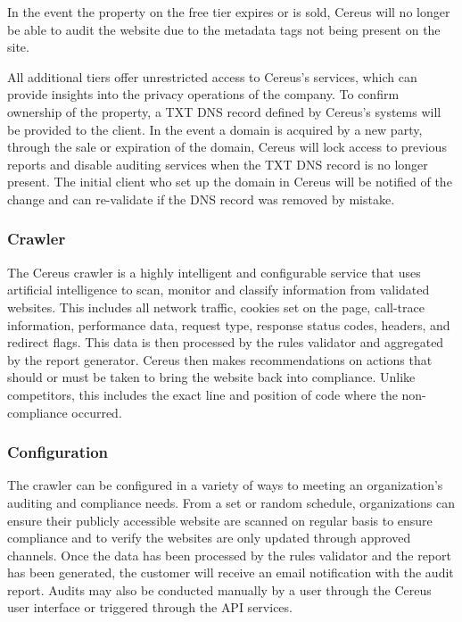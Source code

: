 In the event the property on the free tier expires or is sold, Cereus will no longer be able to audit the website due to the metadata tags not being present on the site. 


All additional tiers offer unrestricted access to Cereus's services, which can provide insights into the privacy operations of the company. To confirm ownership of the property, a TXT DNS record defined by Cereus's systems will be provided to the client. In the event a domain is acquired by a new party, through the sale or expiration of the domain, Cereus will lock access to previous reports and disable auditing services when the TXT DNS record is no longer present. The initial client who set up the domain in Cereus will be notified of the change and can re-validate if the DNS record was removed by mistake.

\subsubsection{Crawler}

The Cereus crawler is a highly intelligent and configurable service that uses artificial intelligence to scan, monitor and classify information from validated websites. This includes all network traffic, cookies set on the page, call-trace information, performance data, request type, response status codes, headers, and redirect flags. This data is then processed by the rules validator and aggregated by the report generator. Cereus then makes recommendations on actions that should or must be taken to bring the website back into compliance. Unlike competitors, this includes the exact line and position of code where the non-compliance occurred.

\subsubsection*{Configuration}

The crawler can be configured in a variety of ways to meeting an organization’s auditing and compliance needs. From a set or random schedule, organizations can ensure their publicly accessible website are scanned on regular basis to ensure compliance and to verify the websites are only updated through approved channels. Once the data has been processed by the rules validator and the report has been generated, the customer will receive an email notification with the audit report. Audits may also be conducted manually by a user through the Cereus user interface or triggered through the API services.

